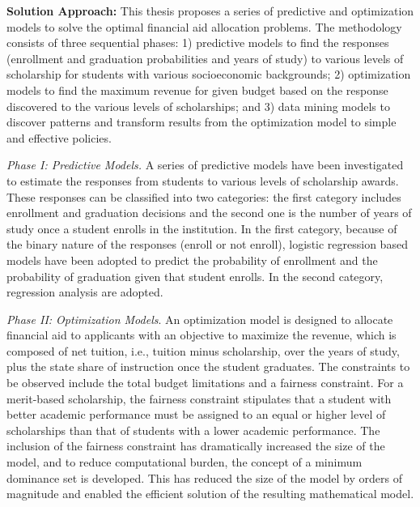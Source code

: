 \documentclass[12pt,english]{report}
\begin{document}
\newpage
\noindent \textbf{Solution Approach:}  This thesis proposes a series of predictive and optimization 
models to solve the optimal financial aid allocation problems. The methodology consists of three 
sequential phases: 1) predictive models to find the responses (enrollment and graduation 
probabilities and years of study) to various levels of scholarship for students with various 
socioeconomic backgrounds; 2)  optimization models to find the maximum revenue for given budget 
based on the response discovered to the various levels of scholarships; and 3) data mining models to 
discover patterns and transform results from the optimization model to simple and effective policies. %

\vspace*{.1in} 
\noindent \textit{Phase I: Predictive Models.} A series of predictive models have been investigated to 
estimate the responses from students to various levels of scholarship awards. These responses can 
be classified into two categories: the first category includes enrollment and graduation decisions and 
the second one is the number of years of study once a student enrolls in the institution. In the first 
category,  because of the binary nature of the responses (enroll or  not enroll), logistic 
regression based models have been adopted to predict the probability of enrollment and the 
probability of graduation given that student enrolls. In the second category,
regression analysis are adopted.

\vspace*{.1in} 
\noindent \textit{Phase II: Optimization Models}. An optimization model is designed to allocate financial aid 
to applicants with an objective to maximize the revenue, which is composed of net tuition, i.e., 
tuition minus scholarship, over the years of study, plus the state share of instruction once the student 
graduates. The constraints to be observed include the total budget limitations and a fairness 
constraint. For a merit-based scholarship, the fairness constraint stipulates that a student with better 
academic performance must be assigned to an equal or higher level of scholarships than that of 
students with a lower academic performance. The inclusion of the fairness constraint has 
dramatically increased the size of the model, and to reduce computational burden, the 
concept of a minimum dominance set is developed.  This has reduced the size of the model by orders 
of magnitude and enabled the efficient solution of the resulting mathematical model. 
\end{document}
